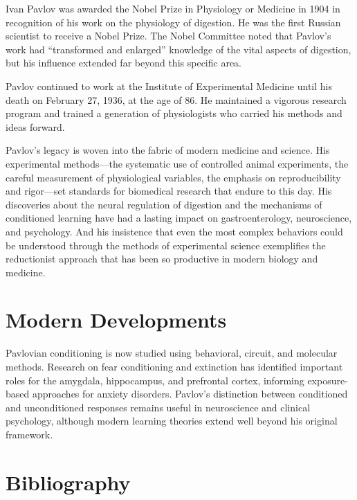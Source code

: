 Ivan Pavlov was awarded the Nobel Prize in Physiology or Medicine in 1904 in recognition of his work on the physiology of digestion. He was the first Russian scientist to receive a Nobel Prize. The Nobel Committee noted that Pavlov's work had ``transformed and enlarged'' knowledge of the vital aspects of digestion, but his influence extended far beyond this specific area.

Pavlov continued to work at the Institute of Experimental Medicine until his death on February 27, 1936, at the age of 86. He maintained a vigorous research program and trained a generation of physiologists who carried his methods and ideas forward.

Pavlov's legacy is woven into the fabric of modern medicine and science. His experimental methods---the systematic use of controlled animal experiments, the careful measurement of physiological variables, the emphasis on reproducibility and rigor---set standards for biomedical research that endure to this day. His discoveries about the neural regulation of digestion and the mechanisms of conditioned learning have had a lasting impact on gastroenterology, neuroscience, and psychology. And his insistence that even the most complex behaviors could be understood through the methods of experimental science exemplifies the reductionist approach that has been so productive in modern biology and medicine.


\section{Modern Developments}

Pavlovian conditioning is now studied using behavioral, circuit, and molecular methods. Research on fear conditioning and extinction has identified important roles for the amygdala, hippocampus, and prefrontal cortex, informing exposure-based approaches for anxiety disorders. Pavlov's distinction between conditioned and unconditioned responses remains useful in neuroscience and clinical psychology, although modern learning theories extend well beyond his original framework.


\section{Bibliography}

